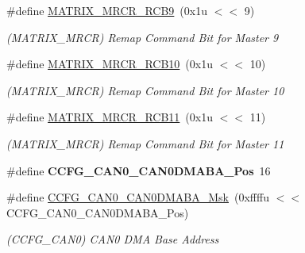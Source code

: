 \begin{DoxyCompactItemize}
\mbox{\label{group__SAMV71__MATRIX_gafecaedb9f83bf43cadbcd24baa58ff43}} 
\#define \mbox{\hyperlink{group__SAMV71__MATRIX_gafecaedb9f83bf43cadbcd24baa58ff43}{M\+A\+T\+R\+I\+X\+\_\+\+M\+R\+C\+R\+\_\+\+R\+C\+B9}}~(0x1u $<$$<$ 9)
\begin{DoxyCompactList}\small\item\em (M\+A\+T\+R\+I\+X\+\_\+\+M\+R\+CR) Remap Command Bit for Master 9 \end{DoxyCompactList}\item 
\mbox{\label{group__SAMV71__MATRIX_gad782e22030a3133cb0d6a3030664bf0f}} 
\#define \mbox{\hyperlink{group__SAMV71__MATRIX_gad782e22030a3133cb0d6a3030664bf0f}{M\+A\+T\+R\+I\+X\+\_\+\+M\+R\+C\+R\+\_\+\+R\+C\+B10}}~(0x1u $<$$<$ 10)
\begin{DoxyCompactList}\small\item\em (M\+A\+T\+R\+I\+X\+\_\+\+M\+R\+CR) Remap Command Bit for Master 10 \end{DoxyCompactList}\item 
\mbox{\label{group__SAMV71__MATRIX_ga1cbcbb862ecff9a039a885ad9a80b732}} 
\#define \mbox{\hyperlink{group__SAMV71__MATRIX_ga1cbcbb862ecff9a039a885ad9a80b732}{M\+A\+T\+R\+I\+X\+\_\+\+M\+R\+C\+R\+\_\+\+R\+C\+B11}}~(0x1u $<$$<$ 11)
\begin{DoxyCompactList}\small\item\em (M\+A\+T\+R\+I\+X\+\_\+\+M\+R\+CR) Remap Command Bit for Master 11 \end{DoxyCompactList}\item 
\mbox{\label{group__SAMV71__MATRIX_ga018f0f05779779fcfdaf7a7dc0c6b67c}} 
\#define {\bfseries C\+C\+F\+G\+\_\+\+C\+A\+N0\+\_\+\+C\+A\+N0\+D\+M\+A\+B\+A\+\_\+\+Pos}~16
\item 
\mbox{\label{group__SAMV71__MATRIX_ga16ce309f038c92ae22b3b9ec99610d7c}} 
\#define \mbox{\hyperlink{group__SAMV71__MATRIX_ga16ce309f038c92ae22b3b9ec99610d7c}{C\+C\+F\+G\+\_\+\+C\+A\+N0\+\_\+\+C\+A\+N0\+D\+M\+A\+B\+A\+\_\+\+Msk}}~(0xffffu $<$$<$ C\+C\+F\+G\+\_\+\+C\+A\+N0\+\_\+\+C\+A\+N0\+D\+M\+A\+B\+A\+\_\+\+Pos)
\begin{DoxyCompactList}\small\item\em (C\+C\+F\+G\+\_\+\+C\+A\+N0) C\+A\+N0 D\+MA Base Address \end{DoxyCompactList}\item 

\end{DoxyCompactItemize}
